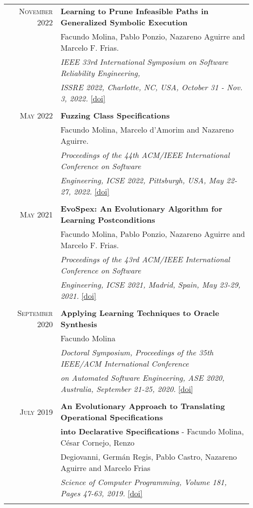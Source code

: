 \documentclass[a4paper,10pt]{article} %
\begin{document}
\begin{longtable}{rl}
\textsc{November} 2022  & \textbf{Learning to Prune Infeasible Paths in Generalized Symbolic Execution} \\
        & Facundo Molina, Pablo Ponzio, Nazareno Aguirre and Marcelo F. Frias.\\
        & \textit{IEEE 33rd International Symposium on Software Reliability Engineering,} \\
        & \textit{ISSRE 2022, Charlotte, NC, USA, October 31 - Nov. 3, 2022.} \href{https://doi.org/10.1109/ISSRE55969.2022.00054}{[doi]} \\ & \\

\textsc{May} 2022  & \textbf{Fuzzing Class Specifications} \\
	& Facundo Molina, Marcelo d'Amorim and Nazareno Aguirre. \\
	& \textit{Proceedings of the 44th ACM/IEEE International Conference on Software} \\
	& \textit{Engineering, ICSE 2022, Pittsburgh, USA, May 22-27, 2022.} \href{https://dl.acm.org/doi/abs/10.1145/3510003.3510120}{[doi]}\\ & \\

\textsc{May} 2021  & \textbf{EvoSpex: An Evolutionary Algorithm for Learning Postconditions} \\
& Facundo Molina, Pablo Ponzio, Nazareno Aguirre and Marcelo F. Frias. \\
& \textit{Proceedings of the 43rd ACM/IEEE International Conference on Software} \\
& \textit{Engineering, ICSE 2021, Madrid, Spain, May 23-29, 2021.} \href{https://doi.ieeecomputersociety.org/10.1109/ICSE43902.2021.00112}{[doi]} \\ & \\

\textsc{September} 2020  & \textbf{Applying Learning Techniques to Oracle Synthesis} \\
& Facundo Molina \\
& \textit{Doctoral Symposium, Proceedings of the 35th IEEE/ACM International Conference} \\
& \textit{on Automated Software Engineering, ASE 2020, Australia, September 21-25, 2020.} \href{https://dl.acm.org/doi/10.1145/3324884.3415287}{[doi]} \\ & \\

\textsc{July} 2019  & \textbf{An Evolutionary Approach to Translating Operational Specifications} \\ & \textbf{into Declarative Specifications} - Facundo Molina, César Cornejo, Renzo\\ 
& Degiovanni, Germán Regis, Pablo Castro, Nazareno Aguirre and Marcelo Frias \\
& \textit{Science of Computer Programming, Volume 181, Pages 47-63, 2019.} \href{https://www.sciencedirect.com/science/article/pii/S0167642319300735}{[doi]} \\ & \\


\end{longtable}
\end{document}
